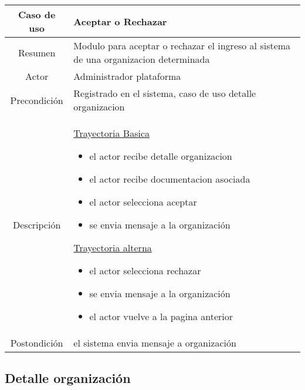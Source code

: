 \documentclass[letterpaper,openright,10pt,oneside]{report}
\begin{document}
\begin{tabular}{|c|p{110mm}|}
\hline
	Caso de uso & Aceptar o Rechazar\\
\hline
	Resumen & Modulo para aceptar o rechazar el ingreso al sistema de una organizacion determinada\\
\hline
	Actor & Administrador plataforma\\
\hline
	Precondición & Registrado en el sistema, caso de uso detalle organizacion\\
\hline
	Descripción & 
	\underline{Trayectoria Basica}
	\begin{itemize}
		\item el actor recibe detalle organizacion
		\item el actor recibe documentacion asociada
		\item el actor selecciona aceptar
		\item se envia mensaje a la organización
	\end{itemize}
	\underline{Trayectoria alterna}
	\begin{itemize}
		\item el actor selecciona rechazar
		\item se envia mensaje a la organización
		\item el actor vuelve a la pagina anterior
	\end{itemize}\\
\hline
	Postondición & el sistema envia mensaje a organización\\
\hline

\end{tabular}
\subsection{Detalle organización}
\end{document}

